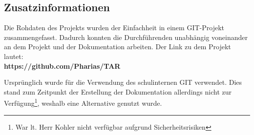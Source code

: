\subsection{Zusatzinformationen}\label{vw_zusatzinformationen}
Die Rohdaten des Projekts wurden der Einfachheit in einem GIT-Projekt zusammengefasst.
Dadurch konnten die Durchführenden unabhängig voneinander an dem Projekt und der Dokumentation arbeiten.
\noindent Der Link zu dem Projekt lautet:\\
\textbf{https://github.com/Pharias/TAR}\par
\noindent Ursprünglich wurde für die Verwendung des schulinternen GIT verwendet.
Dies stand zum Zeitpunkt der Erstellung der Dokumentation allerdings nicht zur Verfügung\footnote{War lt. Herr Kohler nicht verfügbar aufgrund Sicherheitsrisiken}, weshalb eine Alternative genutzt wurde.
